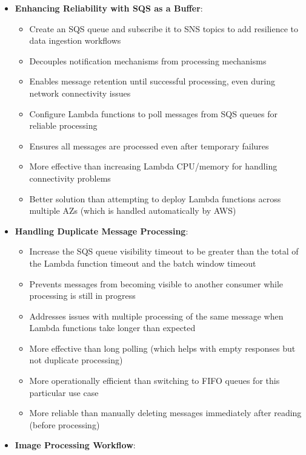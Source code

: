\documentclass[11pt,a4paper]{report}
\begin{document}
\begin{itemize}
\begin{itemize}
  \item Prevents event loss during processing spikes with SQS's message retention capabilities
  \item Creates a resilient architecture that can handle varying event volumes
\end{itemize}
  \item \textbf{Enhancing Reliability with SQS as a Buffer}:
\begin{itemize}
  \item Create an SQS queue and subscribe it to SNS topics to add resilience to data ingestion workflows
  \item Decouples notification mechanisms from processing mechanisms
  \item Enables message retention until successful processing, even during network connectivity issues
  \item Configure Lambda functions to poll messages from SQS queues for reliable processing
  \item Ensures all messages are processed even after temporary failures
  \item More effective than increasing Lambda CPU/memory for handling connectivity problems
  \item Better solution than attempting to deploy Lambda functions across multiple AZs (which is handled automatically by AWS)
\end{itemize}
  \item \textbf{Handling Duplicate Message Processing}:
\begin{itemize}
  \item Increase the SQS queue visibility timeout to be greater than the total of the Lambda function timeout and the batch window timeout
  \item Prevents messages from becoming visible to another consumer while processing is still in progress
  \item Addresses issues with multiple processing of the same message when Lambda functions take longer than expected
  \item More effective than long polling (which helps with empty responses but not duplicate processing)
  \item More operationally efficient than switching to FIFO queues for this particular use case
  \item More reliable than manually deleting messages immediately after reading (before processing)
\end{itemize}
  \item \textbf{Image Processing Workflow}:

\end{itemize}
\end{document}
